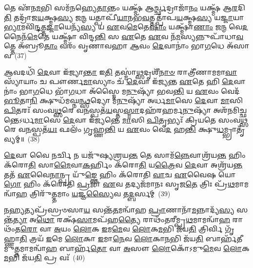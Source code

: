𑌤𑍇 𑌏᳴𑌨\-\ul{𑌮}\-𑌭𑌿 𑌸𑌮᳴𑌨𑌹𑍍𑌯𑍇\-\ul{𑌤𑌾}\-𑌨𑍍𑌤𑌂 𑌯𑌕𑍍𑌷𑍍𑌮᳴ 𑌆\-\ul{𑌰𑍍𑌚𑍍𑌛}\-𑌦𑍍𑌰𑌾𑌜𑌾᳴\-\ul{𑌨𑌂} 𑌯𑌕𑍍𑌷𑍍𑌮᳴ 𑌆\-\ul{𑌰}\-𑌦𑌿\-\ul{𑌤𑌿} 𑌤𑌦𑍍𑌰𑌾᳴𑌜\-\ul{𑌯}\-𑌕𑍍𑌷𑍍𑌮\-\ul{𑌸𑍍𑌯} 𑌜\-\ul{𑌨𑍍𑌮} 𑌯𑌤𑍍𑌪𑌾𑌪𑍀᳴\-\ul{𑌯𑌾}\-𑌨𑌭᳴\-\ul{𑌵}\-𑌤𑍍𑌤\-𑌤𑍍𑌪𑌾᳴𑌪\-\ul{𑌯}\-𑌕𑍍𑌷𑍍𑌮\-\ul{𑌸𑍍𑌯} 𑌯\-\ul{𑌜𑍍𑌜𑌾}\-𑌯𑌾\-\ul{𑌭𑍍𑌯𑌾}\-𑌮𑌵𑌿᳴\-\ul{𑌨𑍍𑌦}\-𑌤𑍍𑌤\-\ul{𑌜𑍍𑌜𑌾}\-𑌯𑍇𑌨𑍍𑌯᳴\-\ul{𑌸𑍍𑌯} 𑌯 \ul{𑌏}\-𑌵\-\ul{𑌮𑍇}\-𑌤𑍇\-\ul{𑌷𑌾𑌂} 𑌯𑌕𑍍𑌷𑍍𑌮𑌾᳴\-\ul{𑌣𑌾𑌂} 𑌜\-\ul{𑌨𑍍𑌮} 𑌵𑍇\-\ul{𑌦} 𑌨𑍈𑌨᳴\-\ul{𑌮𑍇}\-𑌤𑍇 𑌯𑌕𑍍𑌷𑍍𑌮𑌾᳴ 𑌵𑌿𑌨𑍍𑌦\-\ul{𑌨𑍍𑌤𑌿} 𑌸 \ul{𑌏}\-𑌤𑍇 \ul{𑌏}\-𑌵 𑌨᳴\-\ul{𑌮}\-𑌸𑍍𑌯𑌨𑍍𑌨𑍁𑌪𑌾᳴𑌧𑌾\-\ul{𑌵}\-𑌤𑍍𑌤𑍇 𑌅᳴𑌬𑍍𑌰𑍂\-\ul{𑌤𑌾𑌂} 𑌵𑌰𑌂᳴ 𑌵𑍃𑌣𑌾𑌵𑌹𑌾 \ul{𑌆}\-𑌵𑌂 \ul{𑌦𑍇}\-𑌵𑌾𑌨𑌾𑌂॑ 𑌭𑌾\-\ul{𑌗}\-𑌧𑍇 𑌅᳴𑌸𑌾𑌵~(37)

\-\ul{𑌆}\-𑌵𑌦𑌧𑌿᳴ \ul{𑌦𑍇}\-𑌵𑌾 𑌇᳴𑌜𑍍𑌯𑌾\-\ul{𑌨𑍍𑌤𑌾} 𑌇\-\ul{𑌤𑌿} 𑌤𑌸𑍍𑌮𑌾॑\-\ul{𑌥𑍍𑌸}\-𑌦𑍃𑌶𑍀᳴\-\ul{𑌨𑌾}\-\-\ul{𑍞} 𑌰𑌾𑌤𑍍𑌰𑍀᳴𑌣𑌾𑌮𑌮𑌾\-\ul{𑌵𑌾}\-𑌸𑍍𑌯𑌾᳴𑌯𑌾𑌂 𑌚 𑌪𑍗𑌰𑍍𑌣\-\ul{𑌮𑌾}\-𑌸𑍍𑌯𑌾𑌂 𑌚᳴ \ul{𑌦𑍇}\-𑌵𑌾 𑌇᳴𑌜𑍍𑌯𑌨𑍍𑌤 \ul{𑌏}\-𑌤𑍇 𑌹𑌿 \ul{𑌦𑍇}\-𑌵𑌾𑌨𑌾𑌂॑ 𑌭𑌾\-\ul{𑌗}\-𑌧𑍇 𑌭𑌾᳴\-\ul{𑌗}\-𑌧𑌾 𑌅᳴𑌸𑍍𑌮𑍈 𑌮\-\ul{𑌨𑍁}\-𑌷𑍍𑌯𑌾᳴ 𑌭𑌵\-\ul{𑌨𑍍𑌤𑌿} 𑌯 \ul{𑌏}\-𑌵𑌂 𑌵𑍇𑌦᳴ \ul{𑌭𑍂}\-𑌤𑌾\-\ul{𑌨𑌿} 𑌕𑍍𑌷𑍁𑌧᳴𑌮𑌘𑍍𑌨\-\ul{𑌨𑍍𑌥𑍍𑌸}\-𑌦𑍍𑌯𑍋 𑌮᳴\-\ul{𑌨𑍁}\-𑌷𑍍𑌯𑌾᳴ 𑌅𑌰𑍍𑌧\-\ul{𑌮𑌾}\-𑌸𑍇 \ul{𑌦𑍇}\-𑌵𑌾 \ul{𑌮𑌾}\-𑌸𑌿 \ul{𑌪𑌿}\-𑌤𑌰𑌃᳴ 𑌸𑌂𑌵\-\ul{𑌥𑍍𑌸}\-𑌰𑍇 𑌵\-\ul{𑌨}\-𑌸𑍍𑌪𑌤᳴\-\ul{𑌯}\-𑌸𑍍𑌤\-\ul{𑌸𑍍𑌮𑌾}\-𑌦𑌹᳴𑌰𑌹𑌰𑍍𑌮\-\ul{𑌨𑍁}\-𑌷𑍍𑌯𑌾᳴ 𑌅𑌶᳴𑌨𑌮𑌿𑌚𑍍𑌛𑌨𑍍𑌤𑍇\-𑌽𑌰𑍍𑌧\-\ul{𑌮𑌾}\-𑌸𑍇 \ul{𑌦𑍇}\-𑌵𑌾 𑌇᳴𑌜𑍍𑌯𑌨𑍍𑌤𑍇 \ul{𑌮𑌾}\-𑌸𑌿 \ul{𑌪𑌿}\-𑌤𑍃𑌭𑍍𑌯𑌃᳴ 𑌕𑍍𑌰𑌿𑌯𑌤𑍇 𑌸𑌂𑌵\-\ul{𑌥𑍍𑌸}\-𑌰𑍇 𑌵\-\ul{𑌨}\-𑌸𑍍𑌪𑌤᳴\-\ul{𑌯𑌃} 𑌫𑌲𑌂᳴ 𑌗𑍃𑌹𑍍𑌣\-\ul{𑌨𑍍𑌤𑌿} 𑌯 \ul{𑌏}\-𑌵𑌂 𑌵𑍇\-\ul{𑌦} 𑌹\-\ul{𑌨𑍍𑌤𑌿} 𑌕𑍍𑌷𑍁\-\ul{𑌧}\-𑌮𑍍𑌭𑍍𑌰𑌾𑌤𑍃᳴𑌵𑍍𑌯𑌮𑍍॥~(38)

{\anuvakamend[{\-\ul{𑌪}\-\-\ul{𑌶𑍍𑌯}\-\-\ul{𑌤𑌿} 𑌤𑌾\-\ul{𑌭𑍍𑌯𑌾}\-𑌮𑌹᳴𑌰𑍈𑌦𑌸𑌾\-\ul{𑌵} 𑌫𑌲𑍞᳴ \ul{𑌸}\-𑌪𑍍𑌤 𑌚᳴}]}%

\-\ul{𑌦𑍇}\-𑌵𑌾 𑌵𑍈 𑌨𑌰𑍍𑌚𑌿 𑌨 𑌯𑌜𑍁᳴𑌷𑍍𑌯𑌶𑍍𑌰𑌯\-\ul{𑌨𑍍𑌤} 𑌤𑍇 𑌸𑌾𑌮᳴\-\ul{𑌨𑍍𑌨𑍇}\-𑌵𑌾𑌶𑍍𑌰᳴𑌯\-\ul{𑌨𑍍𑌤} 𑌹𑌿𑌂 𑌕᳴𑌰𑍋\-\ul{𑌤𑌿} 𑌸𑌾\-\ul{𑌮𑍈}\-𑌵𑌾\-\ul{𑌕}\-𑌰𑍍\mbox{}𑌹𑌿𑌂 𑌕᳴𑌰𑍋\-\ul{𑌤𑌿} 𑌯\-\ul{𑌤𑍍𑌰𑍈}\-𑌵 \ul{𑌦𑍇}\-𑌵𑌾 𑌅𑌶𑍍𑌰᳴𑌯\-\ul{𑌨𑍍𑌤} 𑌤𑌤᳴ \ul{𑌏}\-𑌵𑍈\-\ul{𑌨𑌾}\-𑌨𑍍𑌪𑍍𑌰 𑌯𑍁᳴\-\ul{𑌙𑍍𑌕𑍍𑌤𑍇} 𑌹𑌿𑌂 𑌕᳴𑌰𑍋𑌤𑌿 \ul{𑌵𑌾}\-𑌚 \ul{𑌏}\-𑌵𑍈𑌷 𑌯𑍋\-\ul{𑌗𑍋} 𑌹𑌿𑌂 𑌕᳴𑌰𑍋𑌤𑌿 \ul{𑌪𑍍𑌰}\-𑌜𑌾 \ul{𑌏}\-𑌵 𑌤𑌦𑍍𑌯𑌜᳴𑌮𑌾𑌨𑌃 𑌸𑍃𑌜\-\ul{𑌤𑍇} 𑌤𑍍𑌰𑌿𑌃 𑌪𑍍𑌰᳴\-\ul{𑌥}\-𑌮𑌾𑌮𑌨𑍍𑌵𑌾᳴\-\ul{𑌹} 𑌤𑍍𑌰𑌿𑌰𑍁᳴\-\ul{𑌤𑍍𑌤}\-𑌮𑌾𑌂 \ul{𑌯}\-𑌜𑍍𑌞\-\ul{𑌸𑍍𑌯𑍈}\-𑌵 𑌤\-\ul{𑌦𑍍𑌬}\-𑌰𑍍\mbox{}𑌸𑌮𑍍~(39)

\-\ul{𑌨}\-\-\ul{𑌹𑍍𑌯}\-𑌤𑍍𑌯𑌪𑍍𑌰᳴𑌸𑍍𑌰𑍞𑌸𑌾\-\ul{𑌯} 𑌸𑌨𑍍𑌤᳴\-\ul{𑌤}\-𑌮𑌨𑍍𑌵𑌾᳴𑌹 \ul{𑌪𑍍𑌰𑌾}\-𑌣𑌾𑌨𑌾᳴\-\ul{𑌮}\-𑌨𑍍𑌨𑌾𑌦𑍍𑌯᳴\-\ul{𑌸𑍍𑌯} 𑌸𑌨𑍍𑌤᳴\-\ul{𑌤𑍍𑌯𑌾} 𑌅\-\ul{𑌥𑍋} 𑌰𑌕𑍍𑌷᳴\-\ul{𑌸𑌾}\-𑌮𑌪᳴𑌹\-\ul{𑌤𑍍𑌯𑍈} 𑌰𑌾𑌥𑌂᳴𑌤𑌰𑍀𑌮𑍍𑌪𑍍𑌰\-\ul{𑌥}\-𑌮𑌾𑌮𑌨𑍍𑌵𑌾᳴\-\ul{𑌹} 𑌰𑌾𑌥𑌂᳴𑌤\-\ul{𑌰𑍋} 𑌵𑌾 \ul{𑌅}\-𑌯𑌂 \ul{𑌲𑍋}\-𑌕 \ul{𑌇}\-𑌮\-\ul{𑌮𑍇}\-𑌵 \ul{𑌲𑍋}\-𑌕\-\ul{𑌮}\-𑌭𑌿 𑌜᳴𑌯\-\ul{𑌤𑌿} 𑌤𑍍𑌰𑌿𑌰𑍍𑌵𑌿 𑌗𑍃᳴𑌹𑍍𑌣𑌾\-\ul{𑌤𑌿} 𑌤𑍍𑌰𑌯᳴ \ul{𑌇}\-𑌮𑍇 \ul{𑌲𑍋}\-𑌕𑌾 \ul{𑌇}\-𑌮𑌾\-\ul{𑌨𑍇}\-𑌵 \ul{𑌲𑍋}\-𑌕𑌾\-\ul{𑌨}\-𑌭𑌿 𑌜᳴𑌯\-\ul{𑌤𑌿} 𑌬𑌾𑌰𑍍\mbox{}𑌹᳴𑌤𑍀𑌮𑍁\-\ul{𑌤𑍍𑌤}\-𑌮𑌾𑌮𑌨𑍍𑌵𑌾᳴\-\ul{𑌹} 𑌬𑌾𑌰𑍍\mbox{}𑌹᳴\-\ul{𑌤𑍋} 𑌵𑌾 \ul{𑌅}\-𑌸𑍗 \ul{𑌲𑍋}\-𑌕𑍋᳴\-𑌽𑌮𑍁\-\ul{𑌮𑍇}\-𑌵 \ul{𑌲𑍋}\-𑌕\-\ul{𑌮}\-𑌭𑌿 𑌜᳴𑌯\-\ul{𑌤𑌿} 𑌪𑍍𑌰 𑌵𑌃᳴~(40)

